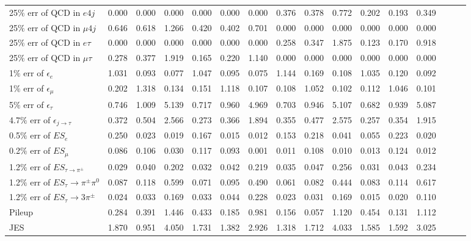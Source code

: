 \begin{sidewaystable}[p]
\begin{tabular}{|l|ccc|ccc|ccc|ccc|ccc|}
  25$\%$ err of QCD in $e 4j$                & 0.000 & 0.000 & 0.000 & 0.000 & 0.000 & 0.000 & 0.376 & 0.378 & 0.772 & 0.202 & 0.193 & 0.349 \\ 
  25$\%$ err of QCD in $\mu 4j$              & 0.646 & 0.618 & 1.266 & 0.420 & 0.402 & 0.701 & 0.000 & 0.000 & 0.000 & 0.000 & 0.000 & 0.000 \\ 
  25$\%$ err of QCD in $e\tau$               & 0.000 & 0.000 & 0.000 & 0.000 & 0.000 & 0.000 & 0.258 & 0.347 & 1.875 & 0.123 & 0.170 & 0.918 \\ 
  25$\%$ err of QCD in $\mu\tau$             & 0.278 & 0.377 & 1.919 & 0.165 & 0.220 & 1.140 & 0.000 & 0.000 & 0.000 & 0.000 & 0.000 & 0.000 \\ 
  1$\%$ err of $\epsilon_e$                  & 1.031 & 0.093 & 0.077 & 1.047 & 0.095 & 0.075 & 1.144 & 0.169 & 0.108 & 1.035 & 0.120 & 0.092 \\ 
  1$\%$ err of $\epsilon_\mu$                & 0.202 & 1.318 & 0.134 & 0.151 & 1.118 & 0.107 & 0.108 & 1.052 & 0.102 & 0.112 & 1.046 & 0.101 \\ 
  5$\%$ err of $\epsilon_\tau$               & 0.746 & 1.009 & 5.139 & 0.717 & 0.960 & 4.969 & 0.703 & 0.946 & 5.107 & 0.682 & 0.939 & 5.087 \\ 
  4.7$\%$ err of $\epsilon_{j\to\tau}$       & 0.372 & 0.504 & 2.566 & 0.273 & 0.366 & 1.894 & 0.355 & 0.477 & 2.575 & 0.257 & 0.354 & 1.915 \\ 
  0.5$\%$ err of $ES_{e}$                    & 0.250 & 0.023 & 0.019 & 0.167 & 0.015 & 0.012 & 0.153 & 0.218 & 0.041 & 0.055 & 0.223 & 0.020 \\ 
  0.2$\%$ err of $ES_{\mu}$                  & 0.086 & 0.106 & 0.030 & 0.117 & 0.093 & 0.001 & 0.011 & 0.108 & 0.010 & 0.013 & 0.124 & 0.012 \\ 
  1.2$\%$ err of $ES_{\tau\to\pi^\pm}$       & 0.029 & 0.040 & 0.202 & 0.032 & 0.042 & 0.219 & 0.035 & 0.047 & 0.256 & 0.031 & 0.043 & 0.234 \\ 
  1.2$\%$ err of $ES_{\tau}\to\pi^\pm\pi^0$  & 0.087 & 0.118 & 0.599 & 0.071 & 0.095 & 0.490 & 0.061 & 0.082 & 0.444 & 0.083 & 0.114 & 0.617 \\ 
  1.2$\%$ err of $ES_{\tau}\to3\pi^\pm$      & 0.024 & 0.033 & 0.169 & 0.033 & 0.044 & 0.228 & 0.023 & 0.031 & 0.169 & 0.015 & 0.020 & 0.110 \\ 
  Pileup                                     & 0.284 & 0.391 & 1.446 & 0.433 & 0.185 & 0.981 & 0.156 & 0.057 & 1.120 & 0.454 & 0.131 & 1.112 \\ 
  JES                                        & 1.870 & 0.951 & 4.050 & 1.731 & 1.382 & 2.926 & 1.318 & 1.712 & 4.033 & 1.585 & 1.592 & 3.025 \\ 

\end{tabular}
\end{sidewaystable}
